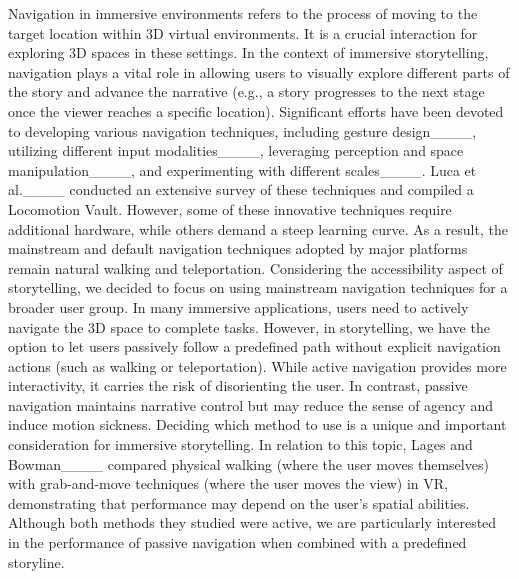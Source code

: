 {Navigation in immersive environments refers to the process of moving to the target location within 3D virtual environments. It is a crucial interaction for exploring 3D spaces in these settings. In the context of immersive storytelling, navigation plays a vital role in allowing users to visually explore different parts of the story and advance the narrative (e.g., a story progresses to the next stage once the viewer reaches a specific location).
Significant efforts have been devoted to developing various navigation techniques, including gesture design____, utilizing different input modalities____, leveraging perception and space manipulation____, and experimenting with different scales____. 
Luca et al.____ conducted an extensive survey of these techniques and compiled a Locomotion Vault. However, some of these innovative techniques require additional hardware, while others demand a steep learning curve.
As a result, the mainstream and default navigation techniques adopted by major platforms remain natural walking and teleportation. Considering the accessibility aspect of storytelling, we decided to focus on using mainstream navigation techniques for a broader user group. In many immersive applications, users need to actively navigate the 3D space to complete tasks. However, in storytelling, we have the option to let users passively follow a predefined path without explicit navigation actions (such as walking or teleportation).
While active navigation provides more interactivity, it carries the risk of disorienting the user. In contrast, passive navigation maintains narrative control but may reduce the sense of agency and induce motion sickness. Deciding which method to use is a unique and important consideration for immersive storytelling.
In relation to this topic, Lages and Bowman____ compared physical walking (where the user moves themselves) with grab-and-move techniques (where the user moves the view) in VR, demonstrating that performance may depend on the user's spatial abilities. Although both methods they studied were active, we are particularly interested in the performance of passive navigation when combined with a predefined storyline.}